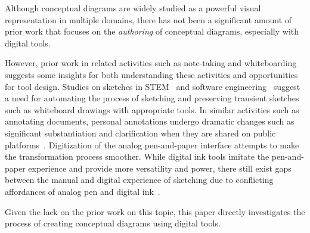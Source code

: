 Although conceptual diagrams are widely studied as a powerful visual representation in multiple domains, there has not been a significant amount of prior work that focuses on the \emph{authoring} of conceptual diagrams, especially with digital tools. 

However, prior work in related activities such as note-taking and whiteboarding suggests some insights for both understanding these activities and opportunities for tool design. Studies on sketches in STEM~\cite{Whiteboards} and software engineering~\cite{Whiteboards-Ko} suggest a need for automating the process of sketching and preserving transient sketches such as whiteboard drawings with appropriate tools. In similar activities such as annotating documents, personal annotations undergo dramatic changes such as significant substantiation and clarification when they are shared on public platforms~\cite{Annotations}. Digitization of the analog pen-and-paper interface attempts to make the transformation process smoother. While digital ink tools imitate the pen-and-paper experience and provide more versatility and power, there still exist gaps between the manual and digital experience of sketching due to conflicting affordances of analog pen and digital ink~\cite{AsWeMayInk}. 

Given the lack on the prior work on this topic,  this paper directly investigates the process of creating conceptual diagrams using digital tools.

 







